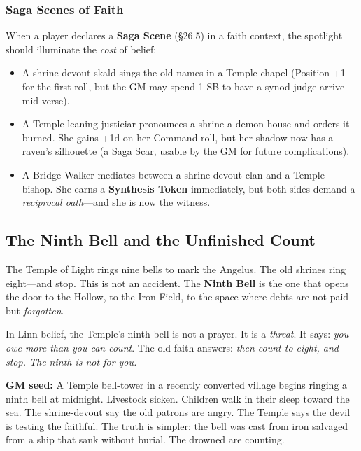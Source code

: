 \documentclass[11pt]{article}
\begin{document}
\subsubsection{Saga Scenes of Faith}

When a player declares a \textbf{Saga Scene} (§26.5) in a faith context, the spotlight should illuminate the \textit{cost} of belief:

\begin{itemize}
\item A shrine-devout skald sings the old names in a Temple chapel (Position +1 for the first roll, but the GM may spend 1 SB to have a synod judge arrive mid-verse).
\item A Temple-leaning justiciar pronounces a shrine a demon-house and orders it burned. She gains +1d on her Command roll, but her shadow now has a raven's silhouette (a Saga Scar, usable by the GM for future complications).
\item A Bridge-Walker mediates between a shrine-devout clan and a Temple bishop. She earns a \textbf{Synthesis Token} immediately, but both sides demand a \textit{reciprocal oath}---and she is now the witness.
\end{itemize}

\subsection{The Ninth Bell and the Unfinished Count}

The Temple of Light rings nine bells to mark the Angelus. The old shrines ring eight---and stop. This is not an accident. The \textbf{Ninth Bell} is the one that opens the door to the Hollow, to the Iron-Field, to the space where debts are not paid but \textit{forgotten}.

In Linn belief, the Temple's ninth bell is not a prayer. It is a \textit{threat}. It says: \textit{you owe more than you can count}. The old faith answers: \textit{then count to eight, and stop. The ninth is not for you.}

\begin{adventurebox}
\textbf{GM seed:} A Temple bell-tower in a recently converted village begins ringing a ninth bell at midnight. Livestock sicken. Children walk in their sleep toward the sea. The shrine-devout say the old patrons are angry. The Temple says the devil is testing the faithful. The truth is simpler: the bell was cast from iron salvaged from a ship that sank without burial. The drowned are counting.
\end{adventurebox}
\end{document}
